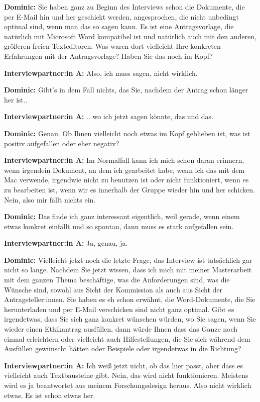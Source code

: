 \documentclass[a4paper,12pt,twoside,numbers=noendperiod]{scrreprt}
\begin{document}
\textbf{Dominic:} Sie haben ganz zu Beginn des Interviews schon die Dokumente, die per E-Mail hin und her geschickt werden, angesprochen, die nicht unbedingt optimal sind, wenn man das so sagen kann. Es ist eine Antragsvorlage, die natürlich mit Microsoft Word kompatibel ist und natürlich auch mit den anderen, größeren freien Texteditoren. Was waren dort vielleicht Ihre konkreten Erfahrungen mit der Antragsvorlage? Haben Sie das noch im Kopf?

\textbf{Interviewpartner:in A:} Also, ich muss sagen, nicht wirklich.

\textbf{Dominic:} Gibt’s in dem Fall nichts, das Sie, nachdem der Antrag schon länger her ist..

\textbf{Interviewpartner:in A:} .. wo ich jetzt sagen könnte, das und das.

\textbf{Dominic:} Genau. Ob Ihnen vielleicht noch etwas im Kopf geblieben ist, was ist positiv aufgefallen oder eher negativ?

\textbf{Interviewpartner:in A:} Im Normalfall kann ich mich schon daran erinnern, wenn irgendein Dokument, an dem ich gearbeitet habe, wenn ich das mit dem Mac verwende, irgendwie nicht zu benutzen ist oder nicht funktioniert, wenn es zu bearbeiten ist, wenn wir es innerhalb der Gruppe wieder hin und her schicken. Nein, also mir fällt nichts ein.

\textbf{Dominic:} Das finde ich ganz interessant eigentlich, weil gerade, wenn einem etwas konkret einfällt und so spontan, dann muss es stark aufgefallen sein.

\textbf{Interviewpartner:in A:} Ja, genau, ja.

\textbf{Dominic:} Vielleicht jetzt noch die letzte Frage, das Interview ist tatsächlich gar nicht so lange. Nachdem Sie jetzt wissen, dass ich mich mit meiner Masterarbeit mit dem ganzen Thema beschäftige, was die Anforderungen sind, was die Wünsche sind, sowohl aus Sicht der Kommission als auch aus Sicht der Antragsteller:innen. Sie haben es eh schon erwähnt, die Word-Dokumente, die Sie herunterladen und per E-Mail verschicken sind nicht ganz optimal. Gibt es irgendetwas, dass Sie sich ganz konkret wünschen würden, wo Sie sagen, wenn Sie wieder einen Ethikantrag ausfüllen, dann würde Ihnen dass das Ganze noch einmal erleichtern oder vielleicht auch Hilfestellungen, die Sie sich während dem Ausfüllen gewünscht hätten oder Beispiele oder irgendetwas in die Richtung?

\textbf{Interviewpartner:in A:} Ich weiß jetzt nicht, ob das hier passt, aber dass es vielleicht auch Textbausteine gibt. Nein, das wird nicht funktionieren. Meistens wird es ja beantwortet aus meinem Forschungsdesign heraus. Also nicht wirklich etwas. Es ist schon etwas her.
\end{document}

